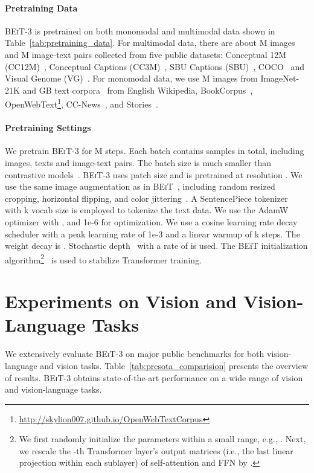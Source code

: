 \documentclass{article}
\newcommand\our{\textsc{BEiT-3}}
\newcommand\beit{\textsc{BEiT}}
\begin{document}
\paragraph{Pretraining Data}
\our{} is pretrained on both monomodal and multimodal data shown in Table~\ref{tab:pretraining_data}.
For multimodal data, there are about M images and M image-text pairs collected from five public datasets: Conceptual 12M (CC12M)~\citep{cc12m}, Conceptual Captions (CC3M)~\citep{gcc}, SBU Captions (SBU)~\citep{sbu}, COCO~\citep{coco} and Visual Genome (VG)~\citep{vg}.
For monomodal data, we use M images from ImageNet-21K and GB text corpora~\citep{unilm2} from English Wikipedia, BookCorpus~\citep{bookcorpus}, OpenWebText\footnote{\url{http://skylion007.github.io/OpenWebTextCorpus}}, CC-News~\citep{roberta}, and Stories~\citep{stories_data}.

\paragraph{Pretraining Settings}
We pretrain \our{} for M steps.
Each batch contains  samples in total, including  images,  texts and  image-text pairs.
The batch size is much smaller than contrastive models~\citep{clip,align,coca}.
\our{} uses  patch size and is pretrained at resolution .
We use the same image augmentation as in \beit{}~\citep{beit}, including random resized cropping, horizontal flipping, and color jittering~\citep{coloraug}.
A SentencePiece tokenizer~\citep{sentencepiece} with k vocab size is employed to tokenize the text data.
We use the AdamW~\citep{adamw} optimizer with ,  and 1e-6 for optimization.
We use a cosine learning rate decay scheduler with a peak learning rate of 1e-3 and a linear warmup of k steps.
The weight decay is .
Stochastic depth~\citep{drop_path} with a rate of  is used.
The BEiT initialization algorithm\footnote{We first randomly initialize the parameters within a small range, e.g., . Next, we rescale the -th Transformer layer's output matrices (i.e., the last linear projection within each sublayer) of self-attention and FFN by .}~\citep{beit} is used to stabilize Transformer training.


\section{Experiments on Vision and Vision-Language Tasks}
\label{sec:exps}

We extensively evaluate \our{} on major public benchmarks for both vision-language and vision tasks.
Table~\ref{tab:presota_comparision} presents the overview of results. 
\our{} obtains state-of-the-art performance on a wide range of vision and vision-language tasks.
\end{document}

